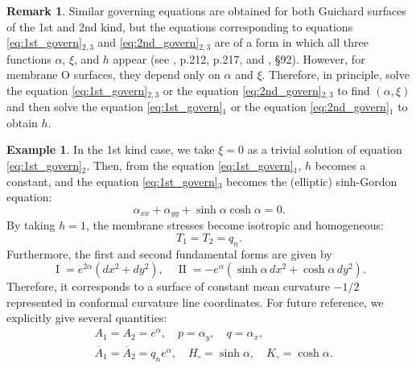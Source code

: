 \documentclass[a4paper]{amsart}
\newcommand{\first}{\operatorname{I}}
\newcommand{\second}{\operatorname{II}}
\theoremstyle{definition}
\newtheorem{rmk}[thm]{Remark}
\newtheorem{ex}[thm]{Example}
\begin{document}
%
\begin{rmk}
Similar governing equations are obtained for both Guichard surfaces of the 1st and 2nd kind, but the equations corresponding to equations \eqref{eq:1st_govern}$_{2,3}$ and \eqref{eq:2nd_govern}$_{2,3}$ are of a form in which all three functions $\alpha$, $\xi$, and $h$ appear (see \cite{Calapso}, p.212, p.217, and \cite{eisenhart_transformation}, \S 92).
However, for membrane O surfaces, they depend only on $\alpha$ and $\xi$.
Therefore, in principle, solve the equation \eqref{eq:1st_govern}${}_{2,3}$ or the equation \eqref{eq:2nd_govern}${}_{2,3}$ to find $(\alpha, \xi)$ and then solve the equation \eqref{eq:1st_govern}${}_1$ or the equation \eqref{eq:2nd_govern}${}_1$ to obtain $h$.
\end{rmk}
%
\begin{ex}
\label{ex:cmc}
In the 1st kind case, we take $\xi = 0$ as a trivial solution of equation \eqref{eq:1st_govern}${}_2$.
Then, from the equation \eqref{eq:1st_govern}${}_1$, $h$ becomes a constant, and the equation \eqref{eq:1st_govern}${}_3$ becomes the (elliptic) sinh-Gordon equation:
\begin{equation}
\alpha_{xx} + \alpha_{yy} + \sinh \alpha \cosh \alpha = 0.
\end{equation}
By taking $h = 1$, the membrane stresses become isotropic and homogeneous:
\begin{equation}
T_1 = T_2 = q_n.
\end{equation}
Furthermore, the first and second fundamental forms are given by
\begin{equation}
\first = e^{2\alpha} (dx^2 + dy^2), \quad
\second = - e^\alpha (\sinh \alpha \, dx^2 + \cosh \alpha \, dy^2).
\end{equation}
Therefore, it corresponds to a surface of constant mean curvature $-1/2$ represented in conformal curvature line coordinates.
For future reference, we explicitly give several quantities:
\begin{equation}
\begin{aligned}
&A_1 = A_2 = e^\alpha, \quad
p = \alpha_y, \quad
q = \alpha_x,\\
&\overline{A}_1 = \overline{A}_2 = q_n e^\alpha, \quad
H_\circ = \sinh \alpha, \quad
K_\circ = \cosh \alpha.
\end{aligned}
\end{equation}
\end{ex}
%
\end{document}
